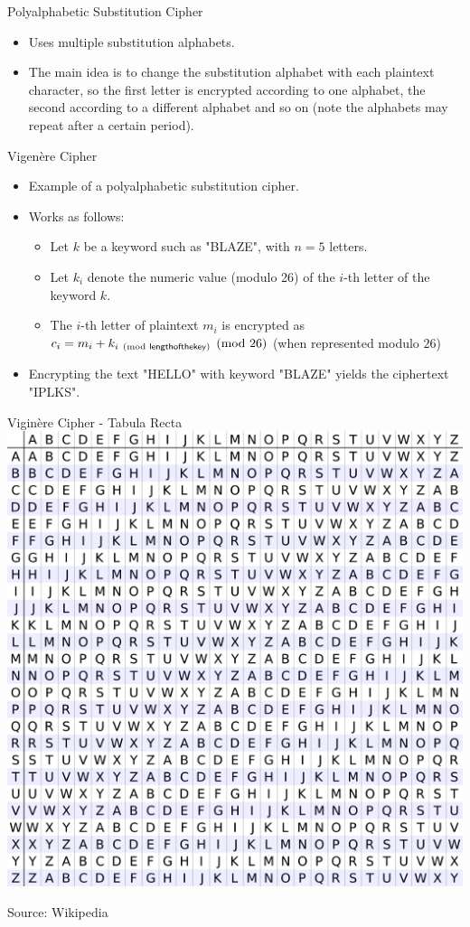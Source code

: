 \documentclass[presentation]{beamer}
\begin{document}
\begin{frame}[label=sec-12]{Polyalphabetic Substitution Cipher}
\begin{itemize}[<+->]
\item Uses multiple substitution alphabets.
\item The main idea is to change the substitution alphabet with each plaintext character, so the first letter is encrypted according to one alphabet, the second according to a different alphabet and so on (note the alphabets may repeat after a certain period).
\end{itemize}
\end{frame}
\begin{frame}[label=sec-13]{Vigenère Cipher}
\begin{itemize}[<+->]
\item Example of a polyalphabetic substitution cipher.
\item Works as follows:
\begin{itemize}
\item Let $k$ be a keyword such as "BLAZE", with $n = 5$ letters.
\item Let $k_i$ denote the numeric value (modulo 26) of the $i$-th letter of the keyword $k$.
\item The $i$-th letter of plaintext $m_i$ is encrypted as $c_i = m_i + k_{i \pmod{\mathsf{length of the key}}} \pmod{26}$ (when represented modulo $26$)
\end{itemize}
\item Encrypting the text "HELLO" with keyword "BLAZE" yields the ciphertext "IPLKS".
\end{itemize}
\end{frame}
\begin{frame}[label=sec-14]{Viginère Cipher - Tabula Recta}
\includegraphics[scale=0.45]{tabula_recta.png}


Source: Wikipedia
\end{frame}
\end{document}

